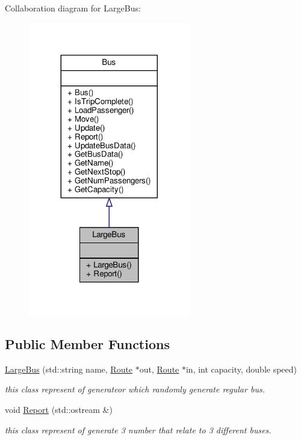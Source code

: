Collaboration diagram for Large\+Bus\+:
\nopagebreak
\begin{figure}[H]
\begin{center}
\leavevmode
\includegraphics[width=200pt]{classLargeBus__coll__graph}
\end{center}
\end{figure}
\subsection*{Public Member Functions}
\begin{DoxyCompactItemize}
\item 
\hyperlink{classLargeBus_a17f3647b231039dbc42b006e51a43aa9}{Large\+Bus} (std\+::string name, \hyperlink{classRoute}{Route} $\ast$out, \hyperlink{classRoute}{Route} $\ast$in, int capacity, double speed)
\begin{DoxyCompactList}\small\item\em this class represent of generateor which randomly generate regular bus. \end{DoxyCompactList}\item 
void \hyperlink{classLargeBus_a401d909a31f2adf60b2f92681a2541d0}{Report} (std\+::ostream \&)
\begin{DoxyCompactList}\small\item\em this class represent of generate 3 number that relate to 3 different buses. \end{DoxyCompactList}\end{DoxyCompactItemize}


